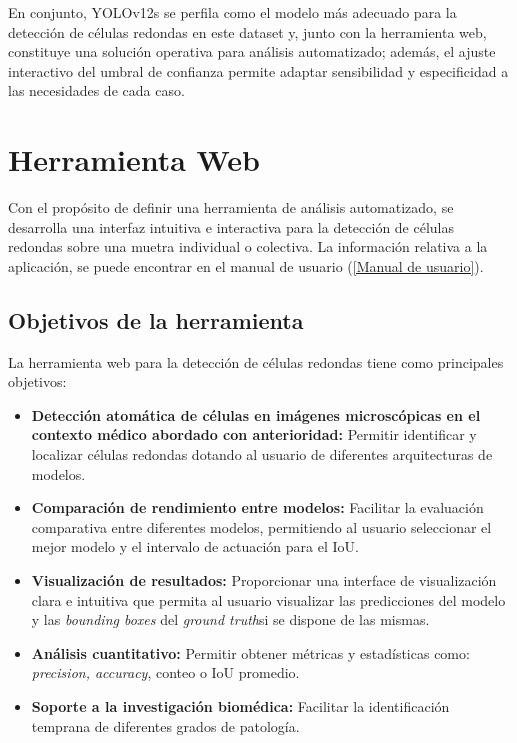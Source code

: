 \documentclass[12pt,a4paper,onecolumn,oneside]{report}
\begin{document}
En conjunto, YOLOv12s se perfila como el modelo más adecuado para la detección de células redondas en este dataset y, junto con la herramienta web, constituye una solución operativa para análisis automatizado; además, el ajuste interactivo del umbral 
de confianza permite adaptar sensibilidad y especificidad a las necesidades de cada caso.

\chapter{Herramienta Web} %
\label{Herramienta web}
Con el propósito de definir una herramienta de análisis automatizado, se desarrolla una interfaz intuitiva e interactiva para la detección 
de células redondas sobre una muetra individual o colectiva. La información relativa a la aplicación,
se puede encontrar en el manual de usuario (\ref{Manual de usuario}).
\section{Objetivos de la herramienta}
\label{sec:Objetivos de la herramienta}

La herramienta web para la detección de células redondas tiene como principales objetivos:

\begin{itemize}
  \item{\textbf{Detección atomática de células en imágenes microscópicas en el contexto médico abordado con anterioridad:} Permitir identificar
  y localizar células redondas dotando al usuario de diferentes arquitecturas de modelos.}
  \item{\textbf{Comparación de rendimiento entre modelos:} Facilitar la evaluación comparativa entre diferentes modelos,
  permitiendo al usuario seleccionar el mejor modelo y el intervalo de actuación para el IoU.}
  \item{\textbf{Visualización de resultados:} Proporcionar una interface de visualización clara e intuitiva que permita al usuario 
  visualizar las predicciones del modelo y las \textit{bounding boxes} del \textit{ground truth}si se dispone de las mismas.}
  \item{\textbf{Análisis cuantitativo:} Permitir obtener métricas y estadísticas como: \textit{precision, accuracy}, conteo o IoU promedio}.
  \item{\textbf{Soporte a la investigación biomédica:} Facilitar la identificación temprana de diferentes grados de patología.} 
\end{itemize}
\end{document}
